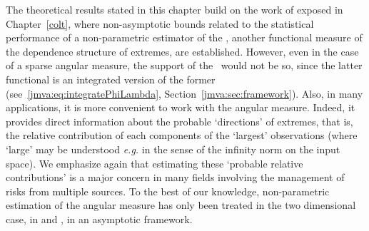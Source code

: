 





The theoretical results stated in this chapter build on the work
of %
\cite{COLT15} exposed in Chapter~\ref{colt}, where non-asymptotic bounds related to the statistical performance of a non-parametric estimator of the \stdf, another functional measure of the dependence structure of extremes,  are established.  
However, even in the case of a sparse angular measure, the support of
the \stdf~would not be so, since the latter functional is  an
integrated version of the former (see~\eqref{jmva:eq:integratePhiLambda},
 Section~\ref{jmva:sec:framework}). Also, 
in many applications, it is more convenient to work with %
 the {angular
  measure}. Indeed, it  provides
direct  information about the
probable `directions' of extremes, that is, the relative contribution
of each components of the `largest' observations  (where `large' may be 
understood \emph{e.g.} in the sense of the infinity norm on the input
space). We emphasize again that estimating these `probable relative contributions' is a major concern in many fields
involving  the management of risks from multiple sources.
To the best of our knowledge, non-parametric estimation of the angular
measure has only been treated in the two dimensional case, in
\cite{Einmahl2001} and \cite{Einmahl2009}, in an asymptotic
framework.

